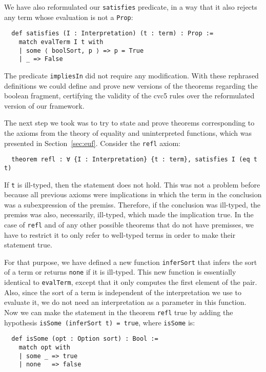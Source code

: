 We have also reformulated our \texttt{satisfies} predicate, in a way that
it also rejects any term whose evaluation is not a \texttt{Prop}:

\begin{verbatim}
  def satisfies (I : Interpretation) (t : term) : Prop :=
    match evalTerm I t with
    | some ⟨ boolSort, p ⟩ => p = True
    | _ => False
\end{verbatim}

The predicate \texttt{impliesIn} did not require any modification. With these
rephrased definitions we could define and prove new versions of
the theorems regarding the boolean fragment, certifying the validity of the
cvc5 rules over the reformulated version of our framework.

The next step we took was to try to state and prove theorems corresponding to the
axioms from the theory of equality and uninterpreted functions, which
was presented in Section~\ref{sec:euf}. Consider the \texttt{refl} axiom:

\begin{verbatim}
  theorem refl : ∀ {I : Interpretation} {t : term}, satisfies I (eq t t)
\end{verbatim}

If \texttt{t} is ill-typed, then the statement does not hold. This was not
a problem before because all previous axioms were implications in which
the term in the conclusion was a subexpression of the premiss. Therefore,
if the conclusion was ill-typed, the premiss was also, necessarily, ill-typed,
which made the implication true. In the case of \texttt{refl} and of
any other possible theorems that do not have premisses, we have to restrict it
to only refer to well-typed terms in order to make their statement true.

For that purpose, we have defined a new function \texttt{inferSort} that infers the sort of a term
or returns \texttt{none} if it is ill-typed.
This new function is essentially identical to
\texttt{evalTerm}, except that it only computes the first element of the pair.
Also, since the sort of a term is independent of the interpretation we use
to evaluate it, we do not need an interpretation as a parameter in this function.
Now we can make the statement in the theorem \texttt{refl} true by adding the hypothesis
\texttt{isSome (inferSort t) = true}, where \texttt{isSome} is:

\begin{verbatim}
  def isSome (opt : Option sort) : Bool :=
    match opt with
    | some _ => true
    | none   => false
\end{verbatim}


